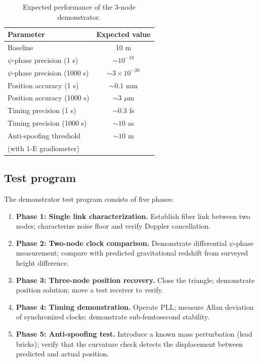 \documentclass[aps,prd,twocolumn,superscriptaddress,nofootinbib]{revtex4-2}
\begin{document}
\begin{table}[t]
\caption{Expected performance of the 3-node demonstrator.}
\label{tab:demo-perf}
\begin{ruledtabular}
\begin{tabular}{lc}
Parameter & Expected value \\
\hline
Baseline & 10 m \\
$\psi$-phase precision (1 s) & $\sim 10^{-18}$ \\
$\psi$-phase precision (1000 s) & $\sim 3\times 10^{-20}$ \\
Position accuracy (1 s) & $\sim 0.1$ mm \\
Position accuracy (1000 s) & $\sim 3$ $\mu$m \\
Timing precision (1 s) & $\sim 0.3$ fs \\
Timing precision (1000 s) & $\sim 10$ as \\
Anti-spoofing threshold & $\sim 10$ m \\
(with 1-E gradiometer) & \\
\end{tabular}
\end{ruledtabular}
\end{table}

\subsection{Test program}\label{sec:test-program}

The demonstrator test program consists of five phases:

\begin{enumerate}
\item \textbf{Phase 1: Single link characterization.}
Establish fiber link between two nodes; characterize noise floor
and verify Doppler cancellation.

\item \textbf{Phase 2: Two-node clock comparison.}
Demonstrate differential $\psi$-phase measurement; compare with
predicted gravitational redshift from surveyed height difference.

\item \textbf{Phase 3: Three-node position recovery.}
Close the triangle; demonstrate position solution; move a test
receiver to verify.

\item \textbf{Phase 4: Timing demonstration.}
Operate PLL; measure Allan deviation of synchronized clocks;
demonstrate sub-femtosecond stability.

\item \textbf{Phase 5: Anti-spoofing test.}
Introduce a known mass perturbation (lead bricks); verify that
the curvature check detects the displacement between
predicted and actual position.
\end{enumerate}
\end{document}
